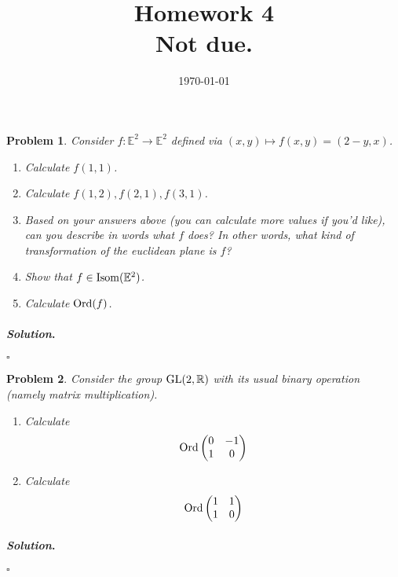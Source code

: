 \documentclass[reqno]{amsart}
\theoremstyle{plain}
\newtheorem{problem}{Problem}
\theoremstyle{definition}
\newenvironment{solution}{\paragraph{\emph{Solution}.}}{\hfill$\square$}
\begin{document}
 

\title[Homework 4]{Homework 4 \\ Not due.}

\date{\today} 
\maketitle 


\begin{problem}
Consider $f:\mathbb{E}^{2} \longrightarrow \mathbb{E}^{2}$ defined via $(x,y) \mapsto f(x,y) = (2-y,x)$.
\begin{enumerate}
\item Calculate $f(1,1)$.
\item Calculate $f(1,2), f(2,1), f(3,1)$.
\item Based on your answers above (you can calculate more values if you'd like), can you describe in words what $f$ does?  In other words, what kind of transformation of the euclidean plane is $f$?
\item Show that $f \in {\rm Isom}(\mathbb{E}^{2})$.
\item Calculate ${\rm Ord}(f)$.
\end{enumerate}
\end{problem}
\begin{solution}

\end{solution}

\begin{problem}
Consider the group ${\rm GL}(2,\mathbb{R})$ with its usual binary operation (namely matrix multiplication).  
\begin{enumerate}
\item Calculate
\begin{equation*}{\rm Ord} \begin{pmatrix} 0 & -1 \\ 1 & 0\end{pmatrix}\end{equation*}
\item Calculate
\begin{equation*}{\rm Ord} \begin{pmatrix} 1 & 1 \\ 1 & 0\end{pmatrix}\end{equation*}
\end{enumerate}
\end{problem}
\begin{solution}

\end{solution}
\end{document}
